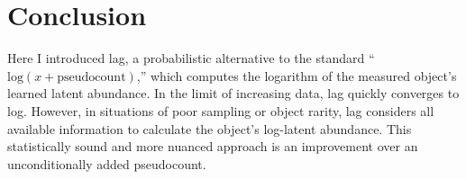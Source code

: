 \documentclass[11pt]{article}
\begin{document}
\section{Conclusion}

Here I introduced lag, a probabilistic alternative to the standard ``$\textrm{log}(x + \textrm{pseudocount})$,'' which computes the logarithm of the measured object's learned latent abundance. In the limit of increasing data, lag quickly converges to log. However, in situations of poor sampling or object rarity,  lag considers all available information to calculate the object's log-latent abundance. This statistically sound and more nuanced approach is an improvement over an unconditionally added pseudocount.
\end{document}
